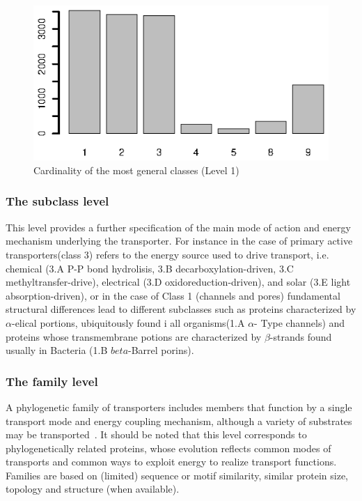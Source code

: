 \documentclass[english]{article}
\begin{document}
  
 
 

\begin{figure}[!h]

\includegraphics[width=12cm]{fig/CardLevel1.ps} 
\caption{Cardinality of the most general classes (Level 1)}
\label{fig:card-level1}
\end{figure}


\subsubsection{The subclass level}
This level provides a further specification of the main mode of action and energy mechanism underlying the transporter.
For instance in the case of primary active transporters(class 3)  refers to the energy source used to drive transport, i.e. chemical (3.A P-P bond hydrolisis, 3.B decarboxylation-driven, 3.C methyltransfer-drive), electrical (3.D oxidoreduction-driven), and solar (3.E light absorption-driven), or in the case of Class 1 (channels and pores) fundamental structural differences lead to different subclasses such as proteins characterized by $\alpha$-elical portions, ubiquitously found i all organisms(1.A $\alpha$- Type channels) and proteins whose transmembrane potions are characterized by $\beta$-strands found usually in Bacteria (1.B $beta$-Barrel porins).


\subsubsection{The family level}
A phylogenetic family of transporters includes members that function by a single transport mode and energy coupling mechanism, although a variety of substrates may be transported~\cite{Saier00}. 
It should be noted that this level corresponds to phylogenetically related proteins, whose evolution reflects common modes of transports and common ways to exploit energy to realize transport functions. Families are based on (limited) sequence or motif similarity, similar protein size, topology and structure (when available).
\end{document}
